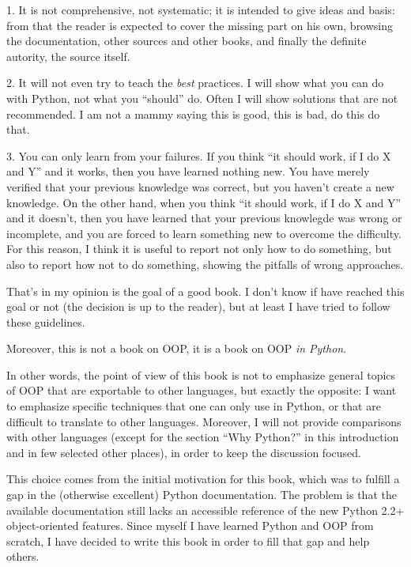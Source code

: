 \documentclass[11pt,english]{book}
\begin{document}
1. It is not comprehensive, not systematic; 
it is intended to give ideas and basis: from
that the reader is expected to cover the missing part on his own,
browsing the documentation, other sources and other books, and finally
the definite autority, the source itself.

2. It will not even try to teach the \emph{best} practices. I will show what you can
do with Python, not what you ``should'' do. Often I will show solutions that are
not recommended. I am not a mammy saying this is
good, this is bad, do this do that.

3. You can only learn from your failures. If you think ``it should work, if I do
X and Y'' and it works, then you have learned nothing new. 
You have merely verified
that your previous knowledge was correct, but you haven't create a new
knowledge. On the other hand, when you think ``it should work, if I do
X and Y'' and it doesn't, then you have learned that your previous knowlegde
was wrong or incomplete, and you are forced to learn something new to
overcome the difficulty. For this reason, I think it is useful to report
not only how to do something, but also to report how not to do something, 
showing the pitfalls of wrong approaches.

That's in my opinion is the goal of a good book. I don't know if have
reached this goal or not (the decision is up to the reader), but at least
I have tried to follow these guidelines.

Moreover, this is not a book on OOP, 
it is a book on OOP \emph{in Python}.

In other words, the point of view of this book is not 
to emphasize general topics of OOP that are exportable to other languages, 
but exactly the opposite: I want to emphasize specific techniques that one
can only use in Python, or that are difficult to translate to other 
languages. Moreover, I will not provide comparisons with other 
languages (except for the section ``Why Python?'' in this introduction and
in few selected other places), 
in order to keep the discussion focused.

This choice comes from the initial motivation for this book, which was 
to fulfill a gap in the (otherwise excellent) Python documentation. 
The problem is that the available documentation still lacks an accessible 
reference of the new Python 2.2+ object-oriented features.
Since myself I have learned Python and OOP from scratch, 
I have decided to write this book in order to fill that gap and
help others.
\end{document}
